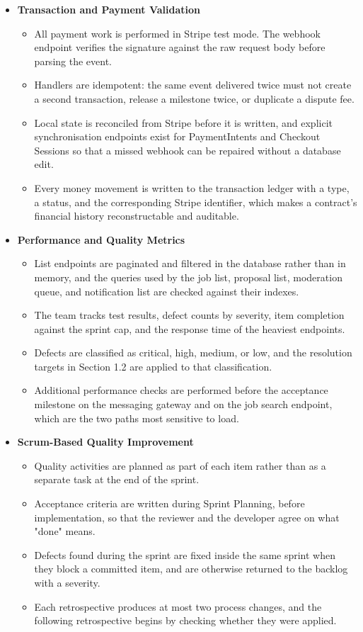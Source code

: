 \begin{itemize}
    \item \textbf{Transaction and Payment Validation}
    \begin{itemize}
        \item All payment work is performed in Stripe test mode. The webhook endpoint verifies the signature against the raw request body before parsing the event.
        \item Handlers are idempotent: the same event delivered twice must not create a second transaction, release a milestone twice, or duplicate a dispute fee.
        \item Local state is reconciled from Stripe before it is written, and explicit synchronisation endpoints exist for PaymentIntents and Checkout Sessions so that a missed webhook can be repaired without a database edit.
        \item Every money movement is written to the transaction ledger with a type, a status, and the corresponding Stripe identifier, which makes a contract's financial history reconstructable and auditable.
    \end{itemize}

    \item \textbf{Performance and Quality Metrics}
    \begin{itemize}
        \item List endpoints are paginated and filtered in the database rather than in memory, and the queries used by the job list, proposal list, moderation queue, and notification list are checked against their indexes.
        \item The team tracks test results, defect counts by severity, item completion against the sprint cap, and the response time of the heaviest endpoints.
        \item Defects are classified as critical, high, medium, or low, and the resolution targets in Section 1.2 are applied to that classification.
        \item Additional performance checks are performed before the acceptance milestone on the messaging gateway and on the job search endpoint, which are the two paths most sensitive to load.
    \end{itemize}

    \item \textbf{Scrum-Based Quality Improvement}
    \begin{itemize}
        \item Quality activities are planned as part of each item rather than as a separate task at the end of the sprint.
        \item Acceptance criteria are written during Sprint Planning, before implementation, so that the reviewer and the developer agree on what "done" means.
        \item Defects found during the sprint are fixed inside the same sprint when they block a committed item, and are otherwise returned to the backlog with a severity.
        \item Each retrospective produces at most two process changes, and the following retrospective begins by checking whether they were applied.
    \end{itemize}


\end{itemize}
